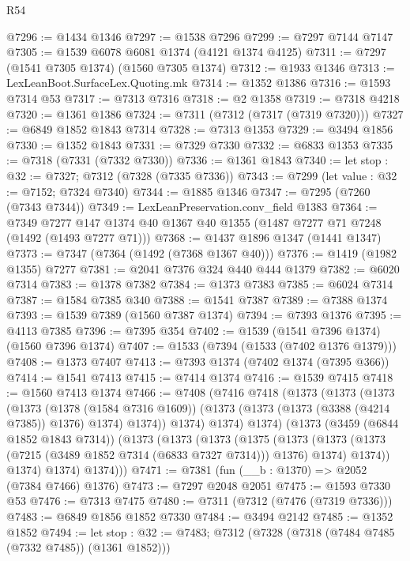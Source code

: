 \begin{lexlean}{R54}
\begin{coremodule}
@7296 := @1434 @1346
@7297 := @1538 @7296
@7299 := @7297 @7144 @7147
@7305 := @1539 @6078 @6081 @1374 (@4121 @1374 @4125)
@7311 := @7297 (@1541 @7305 @1374) (@1560 @7305 @1374)
@7312 := @1933 @1346
@7313 := LexLeanBoot.SurfaceLex.Quoting.mk
@7314 := @1352 @1386
@7316 := @1593 @7314 @53
@7317 := @7313 @7316
@7318 := @2 @1358
@7319 := @7318 @4218
@7320 := @1361 @1386
@7324 := @7311 (@7312 (@7317 (@7319 @7320)))
@7327 := @6849 @1852 @1843 @7314
@7328 := @7313 @1353
@7329 := @3494 @1856
@7330 := @1352 @1843
@7331 := @7329 @7330
@7332 := @6833 @1353
@7335 := @7318 (@7331 (@7332 @7330))
@7336 := @1361 @1843
@7340 := let stop : @32 := @7327; @7312 (@7328 (@7335 @7336))
@7343 := @7299 (let value : @32 := @7152; @7324 @7340)
@7344 := @1885 @1346
@7347 := @7295 (@7260 (@7343 @7344))
@7349 := LexLeanPreservation.conv_field @1383
@7364 := @7349
    @7277
    @147
    @1374
    @40
    @1367
    @40
    @1355
    (@1487 @7277 @71 @7248 (@1492 (@1493 @7277 @71)))
@7368 := @1437 @1896 @1347 (@1441 @1347)
@7373 := @7347 (@7364 (@1492 (@7368 @1367 @40)))
@7376 := @1419 (@1982 @1355) @7277
@7381 := @2041 @7376 @324 @440 @444 @1379
@7382 := @6020 @7314
@7383 := @1378 @7382
@7384 := @1373 @7383
@7385 := @6024 @7314
@7387 := @1584 @7385 @340
@7388 := @1541 @7387
@7389 := @7388 @1374
@7393 := @1539 @7389 (@1560 @7387 @1374)
@7394 := @7393 @1376
@7395 := @4113 @7385
@7396 := @7395 @354
@7402 := @1539 (@1541 @7396 @1374) (@1560 @7396 @1374)
@7407 := @1533 (@7394 (@1533 (@7402 @1376 @1379)))
@7408 := @1373 @7407
@7413 := @7393 @1374 (@7402 @1374 (@7395 @366))
@7414 := @1541 @7413
@7415 := @7414 @1374
@7416 := @1539 @7415
@7418 := @1560 @7413 @1374
@7466 := @7408
    (@7416
      @7418
      (@1373
        (@1373
          (@1373
            (@1373
              (@1378 (@1584 @7316 @1609))
              (@1373 (@1373 (@1373 (@3388 (@4214 @7385)) @1376) @1374) @1374))
            @1374)
          @1374)
        @1374)
      (@1373
        (@3459 (@6844 @1852 @1843 @7314))
        (@1373
          (@1373
            (@1373
              (@1375
                (@1373
                  (@1373 (@1373 (@7215 (@3489 @1852 @7314 (@6833 @7327 @7314))) @1376) @1374)
                  @1374))
              @1374)
            @1374)
          @1374)))
@7471 := @7381 (fun (__b : @1370) => @2052 (@7384 @7466) @1376)
@7473 := @7297 @2048 @2051
@7475 := @1593 @7330 @53
@7476 := @7313 @7475
@7480 := @7311 (@7312 (@7476 (@7319 @7336)))
@7483 := @6849 @1856 @1852 @7330
@7484 := @3494 @2142
@7485 := @1352 @1852
@7494 := let stop : @32 := @7483; @7312 (@7328 (@7318 (@7484 @7485 (@7332 @7485)) (@1361 @1852)))

\end{coremodule}
\end{lexlean}
